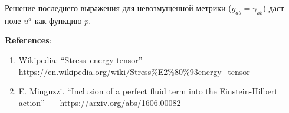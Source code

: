 \documentclass[\docroot/reports/draft/report.tex]{subfiles}
\begin{document}
    Решение последнего выражения для невозмущенной метрики ($g_{ab} = \gamma_{ab}$) даст поле $u^a$ как функцию $p$.

    \vspace{1cm}

    \textbf{\Large{References}}:
    \begin{enumerate}
        \item Wikipedia: \enquote{Stress–energy tensor}~--- \url{https://en.wikipedia.org/wiki/Stress%E2%80%93energy_tensor}
        \item E. Minguzzi. \enquote{Inclusion of a perfect fluid term into the Einstein-Hilbert action}~--- \url{https://arxiv.org/abs/1606.00082}
    \end{enumerate}

\end{document}
